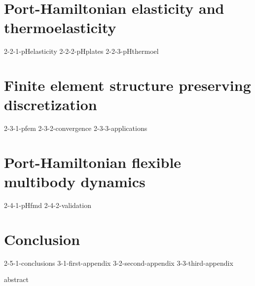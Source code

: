 \documentclass[a4paper,11pt,twoside]{templates/roque-phdthesis-template}
\begin{document}
\part{Port-Hamiltonian elasticity and thermoelasticity}
{2-2-1-pHelasticity}
{2-2-2-pHplates}
{2-2-3-pHthermoel}

\part{Finite element structure preserving discretization}
{2-3-1-pfem}
{2-3-2-convergence}
{2-3-3-applications}

\part{Port-Hamiltonian flexible multibody dynamics}
{2-4-1-pHfmd}
{2-4-2-validation}

\part*{Conclusion}
{2-5-1-conclusions}
\appendix
{3-1-first-appendix}
{3-2-second-appendix}
{3-3-third-appendix}

 



\cleardoublepage
{abstract}
\end{document}
